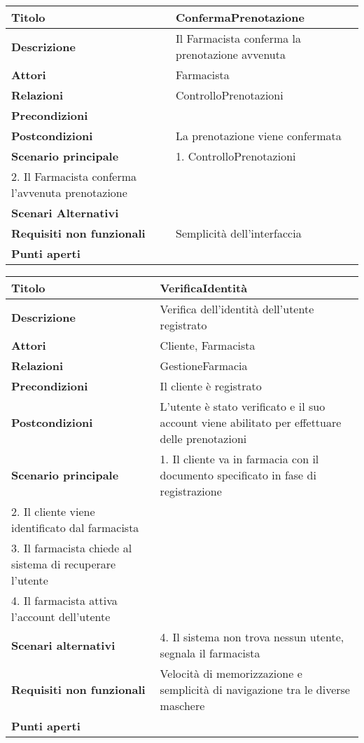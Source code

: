 \begin{tabular} {|P{4.5cm}|P{12.5cm}|}
\hline
  \textbf{Titolo} & ConfermaPrenotazione\\
\hline
  \textbf{Descrizione} & Il Farmacista conferma la prenotazione avvenuta\\
\hline
  \textbf{Attori} & Farmacista\\
\hline
  \textbf{Relazioni} & ControlloPrenotazioni\\
\hline
  \textbf{Precondizioni} &\\
\hline
  \textbf{Postcondizioni} & La prenotazione viene confermata\\
\hline
  \textbf{Scenario principale} & 1. ControlloPrenotazioni \\ 2. Il Farmacista conferma l'avvenuta prenotazione\\
\hline
  \textbf{Scenari Alternativi} & \\
\hline
  \textbf{Requisiti non funzionali} & Semplicità dell'interfaccia\\
\hline
  \textbf{Punti aperti} &\\
\hline
\end{tabular}
\hfill
\break

\begin{tabular} {|P{4.5cm}|P{12.5cm}|}
  \hline
    \textbf{Titolo} & VerificaIdentità\\
  \hline
    \textbf{Descrizione} & Verifica dell'identità dell'utente registrato\\
  \hline
    \textbf{Attori} & Cliente, Farmacista\\
  \hline
    \textbf{Relazioni} & GestioneFarmacia\\
  \hline
    \textbf{Precondizioni} & Il cliente è registrato\\
  \hline
    \textbf{Postcondizioni} & L'utente è stato verificato e il suo account viene abilitato per effettuare delle prenotazioni\\
  \hline
    \textbf{Scenario principale} & 1. Il cliente va in farmacia con il documento specificato in fase di registrazione \\ 2. Il cliente viene identificato dal farmacista \\ 3. Il farmacista chiede al sistema di recuperare l'utente \\ 4. Il farmacista attiva l'account dell'utente\\
  \hline
    \textbf{Scenari alternativi} & 4. Il sistema non trova nessun utente, segnala il farmacista\\
  \hline
  \textbf{Requisiti non funzionali} & Velocità di memorizzazione e semplicità di navigazione tra le diverse maschere\\
  \hline
    \textbf{Punti aperti} &\\
  \hline
\end{tabular}
\hfill
\break


